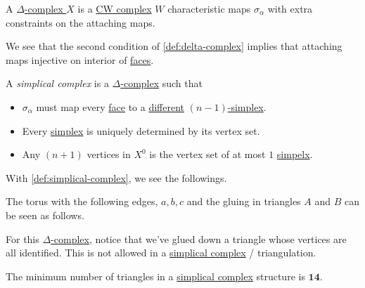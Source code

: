 \begin{exercise}
	A \hyperref[def:delta-complex]{\(\Delta\)-complex } \(X\) is a \hyperref[def:CW-Complex]{CW complex} \(W\) characteristic maps \(\sigma _\alpha \)
	with extra constraints on the attaching maps.
\end{exercise}
\begin{note}
	We see that the second condition of \autoref{def:delta-complex} implies that attaching maps injective on interior of \hyperref[def:face]{faces}.
\end{note}

\begin{definition}\label{def:simplical-complex}
	A \emph{simplical complex} is a \hyperref[def:delta-complex]{\(\Delta \)-complex} such that
	\begin{itemize}
		\item \(\sigma _\alpha \) must map every \hyperref[def:face]{face} to a \underline{different} \hyperref[def:standard-simplex]{\((n-1)\)-simplex}.
		\item Every \hyperref[def:standard-simplex]{simplex} is uniquely determined by its vertex set.
		\item Any \((n+1)\) vertices in \(X^0\) is the vertex set of at most \(1\) \hyperref[def:standard-simplex]{simpelx}.
	\end{itemize}
\end{definition}
\begin{remark}
	With \autoref{def:simplical-complex}, we see the followings.
	\begin{figure}[H]
		\centering
		\label{fig:rmk:simplical-complex}
	\end{figure}
\end{remark}

\begin{eg}
	The torus with the following edges, \(a, b, c\) and the gluing in triangles \(A\) and \(B\) can be seen as follows.
	\begin{figure}[H]
		\centering
		\label{fig:eg:constructing-torus-simplical}
	\end{figure}
	For this \hyperref[def:delta-complex]{\(\Delta \)-complex}, notice that we've glued down a triangle whose vertices are all
	identified. This is not allowed in a \hyperref[def:simplical-complex]{simplical complex} / triangulation.

	\begin{remark}
		The minimum number of triangles in a \hyperref[def:simplical-complex]{simplical complex} structure is \(\bm{14}\).
	\end{remark}
\end{eg}